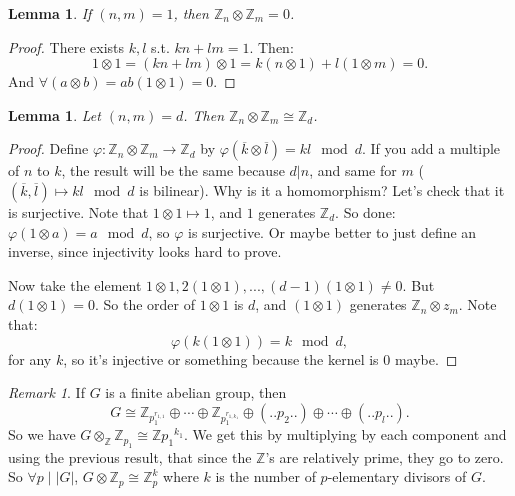 \documentclass[12pt]{amsbook}
\theoremstyle{plain}
\numberwithin{section}{chapter}
\numberwithin{equation}{chapter}
\newtheorem{lem}[theorem]{Lemma}
\theoremstyle{definition}
\theoremstyle{remark}
\newtheorem{rem}[theorem]{Remark}
\newcommand{\z}{\mathbb{Z}}
\newcommand{\bee}{\begin{equation}\begin{aligned}}
\newcommand{\eee}{\end{aligned}\end{equation}}
\newcommand{\tens}{\otimes}
\renewcommand{\bar}{\overline}%
\renewcommand{\phi}{\varphi}
\begin{document}
\begin{lem}
If $(n,m) = 1$, then $\z_n \tens \z_m = 0$. 
\end{lem}

\begin{proof}
There exists $k,l$ s.t. $kn + lm = 1$. Then:
$$
1 \tens 1 = (kn + lm) \tens 1 = k(n \tens 1) + l (1 \tens m) = 0.
$$
And $\forall (a \tens b) = ab(1 \tens 1) = 0$. 
\end{proof}

\begin{lem}
Let $(n,m) = d$. Then $\z_n \tens \z_m \cong \z_d$. 
\end{lem}

\begin{proof}
Define $\phi: \z_n \tens \z_m \to \z_d$ by $\phi(\bar{k}\tens \bar{l}) = kl \mod d$. If you add a multiple of $n$ to $k$, the result will be the same because $d|n$, and same for $m$ ($(\bar{k},\bar{l}) \mapsto kl \mod d$ is bilinear). Why is it a homomorphism? Let's check that it is surjective. Note that $1 \tens 1 \mapsto 1$, and $1$ generates $\z_d$. So done: $\phi(1 \tens a) = a \mod d$, so $\phi$ is surjective. Or maybe better to just define an inverse, since injectivity looks hard to prove. \begin{comment}Any tensor $w \in \z_n \tens \z_m$ is such that: 
\bee
w &= \sum_{i = 1}^n c_i(\bar{k_i} \tens \bar{l_i})\\
&= \sum_{i  =1}^n c_ik_il_i (1 \tens 1)
\eee
And $\phi(w) = \sum{i = 1}^n c_ik_i l_i \mod d$. So $w \in ker\phi$ if and only if $\sum c_ik_il_i \equiv 0 \mod d$.\end{comment} Now take the element $1 \tens 1,2(1\tens 1),...,(d - 1)(1\tens 1) \neq 0$. But $d(1 \tens 1) = 0$. So the order of $1 \tens 1$ is $d$, and $(1 \tens 1)$ generates $\z_n \tens z_m$. Note that:
$$
\phi(k(1\tens 1)) = k \mod d,
$$ 
for any $k$, so it's injective or something because the kernel is 0 maybe. 
\end{proof}

\begin{rem}
If $G$ is a finite abelian group, then 
$$
G \cong \z_{p_1^{r_{1,1}}} \oplus \cdots \oplus \z_{p_1^{r_{1,k_1}}} \oplus ( ..p_2.. ) \oplus \cdots \oplus (..p_l..). 
$$
So we have $G \tens_\z \z_{p_1} \cong \z{p_1}^{k_1}$. We get this by multiplying by each component and using the previous result, that since the $\z$'s are relatively prime, they go to zero. So $\forall p\mid |G|$, $G \tens \z_p \cong \z_p^k$ where $k$ is the number of $p$-elementary divisors of $G$. 
\end{rem}
\end{document}
